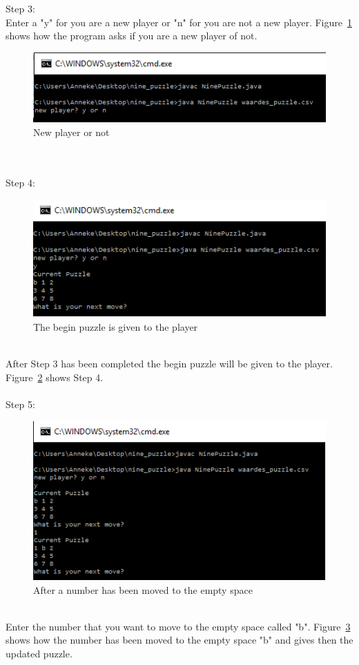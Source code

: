 \documentclass[10pt]{article}
\begin{document}
\\
\\Step 3: 
\\Enter a "y" for you are a new player or "n" for you are not a new player. Figure~\ref{prent1} shows how the program asks if you are a new player of not.
\begin{figure}
\centering
 \includegraphics[scale=0.8]{./Prente/prent1.png}
 \caption{New player or not}
 \label{prent1}
\end{figure}
\\
\\Step 4:
\begin{figure}
\centering
 \includegraphics[scale=0.8]{./Prente/prent2.png}
 \caption{The begin puzzle is given to the player}
 \label{prent2}
\end{figure}
\\After Step 3 has been completed the begin puzzle will be given to the player. Figure~\ref{prent2} shows Step 4.
\\
\\Step 5:
\begin{figure}
\centering
 \includegraphics[scale=0.8]{./Prente/prent3.png}
 \caption{After a number has been moved to the empty space}
 \label{prent3}
\end{figure}
\\Enter the number that you want to move to the empty space called "b". Figure~\ref{prent3} shows how the number has been moved to the empty space "b" and gives then the updated puzzle.
\end{document}
